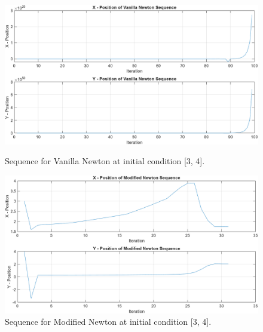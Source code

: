 \begin{figure}[!htb]
  \centering
  \begin{minipage}{0.45\textwidth}
    \centering
    \includegraphics[width=\linewidth]{Images/Fenton_34_VN.png}
    \caption{Sequence for Vanilla Newton at initial condition [3, 4].}
    \label{fig:VN42}
  \end{minipage}\hfill
  \begin{minipage}{0.45\textwidth}
    \centering
    \includegraphics[width=\linewidth]{Images/Fenton_34_NMHM.png}
    \caption{Sequence for Modified Newton at initial condition [3, 4].}
    \label{fig:NMHM42}
  \end{minipage}
\end{figure}
\vspace{1cm}
